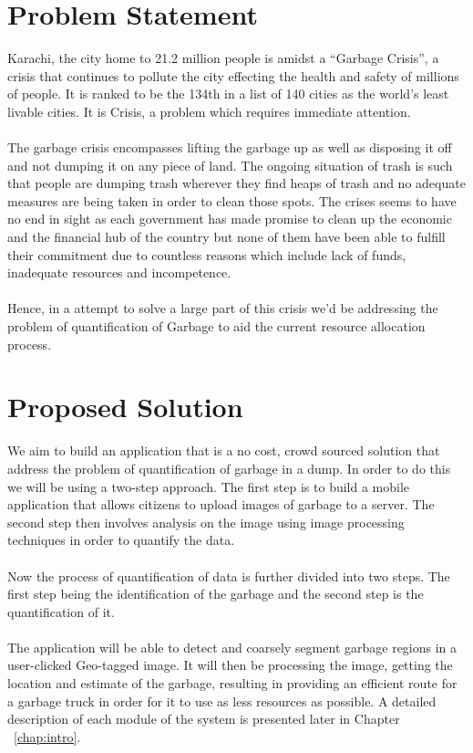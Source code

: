 \section{Problem Statement}
Karachi, the city home to 21.2 million people is amidst a “Garbage Crisis”, a crisis that continues to pollute the city effecting the health and safety of millions of people. It is ranked to be the 134th in a list of 140 cities as the world’s least livable cities. It is Crisis, a problem which requires immediate attention.\\
\\
The garbage crisis encompasses lifting the garbage up as well as disposing it off and not dumping it on any piece of land. The ongoing situation of trash is such that people are dumping trash wherever they find heaps of trash and no adequate measures are being taken in order to clean those spots. The crises seems to have no end in sight as each government has made promise to clean up the economic and the financial hub of the country but none of them have been able to fulfill their commitment due to countless reasons which include lack of funds, inadequate resources and incompetence.\\
\\
Hence, in a attempt to solve a large part of this crisis we'd be addressing the problem of quantification of Garbage to aid the current resource allocation process.


\section{Proposed Solution}

We aim to build an application that is a no cost, crowd sourced solution that address the problem of quantification of garbage in a dump. In order to do this we will be using a two-step approach. The first step is to build a mobile application that allows citizens to upload images of garbage to a server. The second step then involves analysis on the image using image processing techniques in order to quantify the data.\\
\\
Now the process of quantification of data is further divided into two steps. The first step being the identification of the garbage and the second step is the quantification of it.\\
\\
The application will be able to detect and coarsely segment garbage regions in a user-clicked Geo-tagged image. It will then be processing the image, getting the location and estimate of the garbage, resulting in providing an efficient route for a garbage truck in order for it to use as less resources as possible.
A detailed description of each module of the system is presented later in Chapter ~\ref{chap:intro}.

